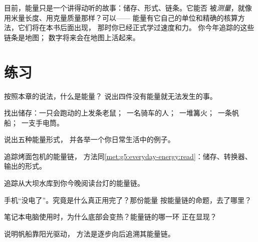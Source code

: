 \begin{remark}[一个我们将要讲清楚的词]\label{rem:g5:everyday-energy:promise}
目前，能量只是一个讲得动听的故事：储存、形式、链条。它能否
被\emph{测量}，就像用米量长度、用克量质量那样？可以——
能量有它自己的单位和精确的核算方法，它们将在本书后面出现，
那时你已经正式学过速度和力。
你今年追踪的这些链条是地图；
数字将来会在地图上活起来。
\end{remark}

\section{练习}

\begin{exercise}[$\star$]\label{exo:g5:everyday-energy:1}
按照本章的说法，什么是能量？
说出四件没有能量就无法发生的事。
\end{exercise}

\begin{exercise}[$\star$]\label{exo:g5:everyday-energy:2}
找出储存：一只会跑动的上发条老鼠；\ 一名骑车的人；\ 
一堆篝火；\ 一条帆船；\ 一支手电筒。
\end{exercise}

\begin{exercise}[$\star$]\label{exo:g5:everyday-energy:3}
说出五种能量形式，
并各举一个你日常生活中的例子。
\end{exercise}

\begin{exercise}[$\star$]\label{exo:g5:everyday-energy:4}
追踪烤面包机的能量链，
方法同\cref{met:g5:everyday-energy:read}：储存、转换器、输出的形式。
\end{exercise}

\begin{exercise}[$\star$]\label{exo:g5:everyday-energy:5}
追踪从大坝水库到你今晚阅读台灯的能量链。
\end{exercise}

\begin{exercise}[$\star$]\label{exo:g5:everyday-energy:6}
手机“没电了”。究竟是什么真正用完了？那份能量
按能量链的命题，去了哪里？
\end{exercise}

\begin{exercise}[$\star$]\label{exo:g5:everyday-energy:7}
笔记本电脑使用时，为什么底部会变热？能量链的哪一环
正在显现？
\end{exercise}

\begin{exercise}[$\star$]\label{exo:g5:everyday-energy:8}
说明帆船靠阳光驱动，
方法是逐步向后追溯其能量链。
\end{exercise}

